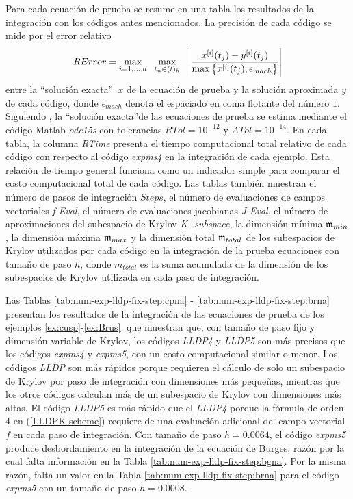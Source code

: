 Para cada ecuación de prueba se resume en una tabla los resultados de la integración con los códigos antes mencionados. La precisión de cada código se mide por el error relativo
\begin{equation}\label{num-exp-lldp-fix-step:ER}
	RError = \max_{i=1,\ldots,d} \;\ \max_{t_n\in(t)_h}  \;\ \left\lvert\frac{x^{[i]}(t_j)-y^{[i]}(t_j)}{\maxx{x^{[i]}(t_j),\epsilon_{mach}}}\right\rvert
\end{equation}
entre la \textquotedblleft solución exacta\textquotedblright~$x$ de la ecuación de prueba y la solución aproximada $y$ de cada código, donde $\epsilon_{mach}$ denota el espaciado en coma flotante del número $1$. Siguiendo \cite{tokman2006efficient}, la \textquotedblleft solución exacta\textquotedblright de las ecuaciones de prueba se estima mediante el código Matlab \textit{ode15s} con tolerancias $RTol=10^{-12}$ y $ATol=10^{-14}$. En cada tabla, la columna \textit{RTime} presenta el tiempo computacional total relativo de cada código con respecto al código \emph{expms4} en la integración de cada ejemplo. Esta relación de tiempo general funciona como un indicador simple para comparar el costo computacional total de cada código. Las tablas también muestran el número de pasos de integración $Steps$, el número de evaluaciones de campos vectoriales \textit{f-Eval}, el número de evaluaciones jacobianas \textit{J-Eval}, el número de aproximaciones del subespacio de Krylov \textit{K -subspace}, la dimensión mínima $\mathfrak{m}_{min}$, la dimensión máxima $\mathfrak{m}_{max}$ y la dimensión total $\mathfrak{m}_{total}$ de los subespacios de Krylov utilizados por cada código en la integración de la prueba ecuaciones con tamaño de paso $h$, donde $m_{total}$ es la suma acumulada de la dimensión de los subespacios de Krylov utilizada en cada paso de integración.

Las Tablas \ref{tab:num-exp-lldp-fix-step:cpna} - \ref{tab:num-exp-lldp-fix-step:brna} presentan los resultados de la integración de las ecuaciones de prueba de los ejemplos \ref{ex:cusp}-\ref{ex:Brus}, que muestran que, con tamaño de paso fijo y dimensión variable de Krylov, los códigos \emph{LLDP4} y \emph{LLDP5} son más precisos que los códigos \emph{expms4} y \emph{expms5}, con un costo computacional similar o menor. Los códigos \emph{LLDP} son más rápidos porque requieren el cálculo de solo un subespacio de Krylov por paso de integración con dimensiones más pequeñas, mientras que los otros códigos calculan más de un subespacio de Krylov con dimensiones más altas. El código \emph{LLDP5} es más rápido que el \emph{LLDP4} porque la fórmula de orden 4 en (\ref{LLDPK scheme}) requiere de una evaluación adicional del campo vectorial $f$ en cada paso de integración. Con tamaño de paso $h = 0.0064$, el código \emph{expms5} produce desbordamiento en la integración de la ecuación de Burges, razón por la cual falta información en la Tabla \ref{tab:num-exp-lldp-fix-step:bgna}. Por la misma razón, falta un valor en la Tabla \ref{tab:num-exp-lldp-fix-step:brna} para el código \emph{expms5} con un tamaño de paso $h = 0.0008$.

